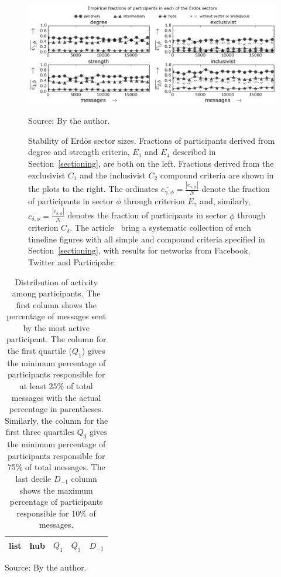 \begin{figure} 
\centering
\includegraphics[width=\textwidth]{figs/InText-WLAU-S1000__}
\caption{Stability of Erd\"os sector sizes.
Fractions of participants derived from degree and strength criteria, $E_1$ and $E_4$ described in Section~\ref{sectioning}, are both on the left.
Fractions derived from the exclusivist $C_1$ and the inclusivist $C_2$ compound criteria are shown in the plots to the right.
The ordinates $\overline{e_{\gamma,\phi}}=\frac{|e_{\gamma,\phi}|}{N}$ denote the fraction of participants in sector $\phi$ through criterion $E_\gamma$
and, similarly, $\overline{c_{\delta,\phi}}=\frac{|c_{\delta,\phi}|}{N}$ denotes the fraction of participants in sector $\phi$ through criterion $C_\delta$.
The article~\cite{stab} bring a systematic collection of such timeline figures with all simple and compound criteria specified in Section~\ref{sectioning}, with results for networks from Facebook, Twitter and Participabr.}
\begin{flushleft}\footnotesize
Source: By the author.\
\end{flushleft}
\label{fig:sectIL}
\end{figure}


\begin{table}[h]
\caption{Distribution of activity among participants.
The first column shows the percentage of messages sent by the most active participant. The column for the first quartile ($Q_1$) gives the minimum percentage of participants responsible for at least 25\% of total messages with the actual percentage in parentheses. Similarly, the column for the first three quartiles $Q_3$ gives the minimum percentage of participants responsible for 75\% of total messages.
The last decile $D_{-1}$ column shows the maximum percentage of participants responsible for 10\% of messages.}
\begin{center}
\begin{tabular}{ l ||  c | c | c | c }
\hline
list & hub & $ Q_1 $ & $ Q_3 $ & $D_{-1}$ \\ \hline\hline

\end{tabular}
\end{center}
\begin{flushleft}\footnotesize
Source: By the author.\
\end{flushleft}
\label{autores}
\end{table}


